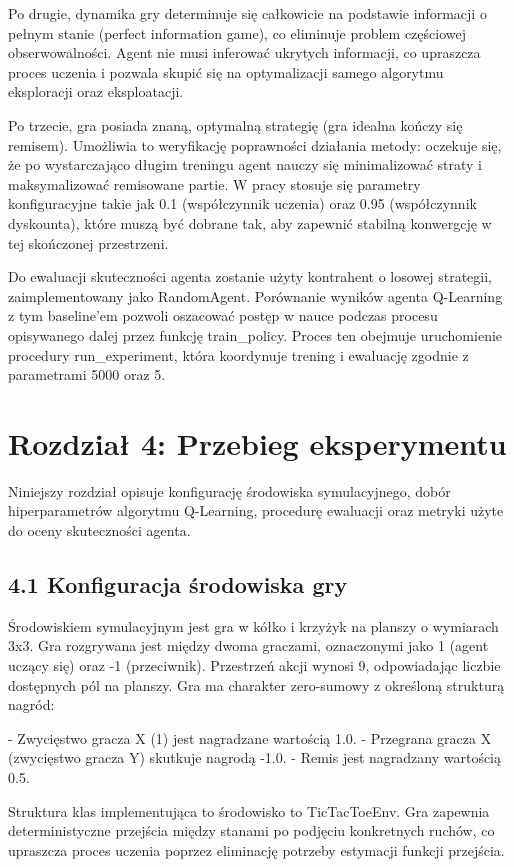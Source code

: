 \documentclass[conference]{IEEEtran}
\begin{document}
Po drugie, dynamika gry determinuje się całkowicie na podstawie informacji o pełnym stanie (perfect information game), co eliminuje problem częściowej obserwowalności. Agent nie musi inferować ukrytych informacji, co upraszcza proces uczenia i pozwala skupić się na optymalizacji samego algorytmu eksploracji oraz eksploatacji.

Po trzecie, gra posiada znaną, optymalną strategię (gra idealna kończy się remisem). Umożliwia to weryfikację poprawności działania metody: oczekuje się, że po wystarczająco długim treningu agent nauczy się minimalizować straty i maksymalizować remisowane partie. W pracy stosuje się parametry konfiguracyjne takie jak 0.1 (współczynnik uczenia) oraz 0.95 (współczynnik dyskounta), które muszą być dobrane tak, aby zapewnić stabilną konwergcję w tej skończonej przestrzeni.

Do ewaluacji skuteczności agenta zostanie użyty kontrahent o losowej strategii, zaimplementowany jako RandomAgent. Porównanie wyników agenta Q-Learning z tym baseline'em pozwoli oszacować postęp w nauce podczas procesu opisywanego dalej przez funkcję train\_policy. Proces ten obejmuje uruchomienie procedury run\_experiment, która koordynuje trening i ewaluację zgodnie z parametrami 5000 oraz 5.

\section{Rozdział 4: Przebieg eksperymentu}
Niniejszy rozdział opisuje konfigurację środowiska symulacyjnego, dobór hiperparametrów algorytmu Q-Learning, procedurę ewaluacji oraz metryki użyte do oceny skuteczności agenta.

\subsection{4.1 Konfiguracja środowiska gry}
Środowiskiem symulacyjnym jest gra w kółko i krzyżyk na planszy o wymiarach 3x3. Gra rozgrywana jest między dwoma graczami, oznaczonymi jako 1 (agent uczący się) oraz -1 (przeciwnik). Przestrzeń akcji wynosi 9, odpowiadając liczbie dostępnych pól na planszy. Gra ma charakter zero-sumowy z określoną strukturą nagród:

- Zwycięstwo gracza X (1) jest nagradzane wartością 1.0.
- Przegrana gracza X (zwycięstwo gracza Y) skutkuje nagrodą -1.0.
- Remis jest nagradzany wartością 0.5.

Struktura klas implementująca to środowisko to TicTacToeEnv. Gra zapewnia deterministyczne przejścia między stanami po podjęciu konkretnych ruchów, co upraszcza proces uczenia poprzez eliminację potrzeby estymacji funkcji przejścia.
\end{document}
